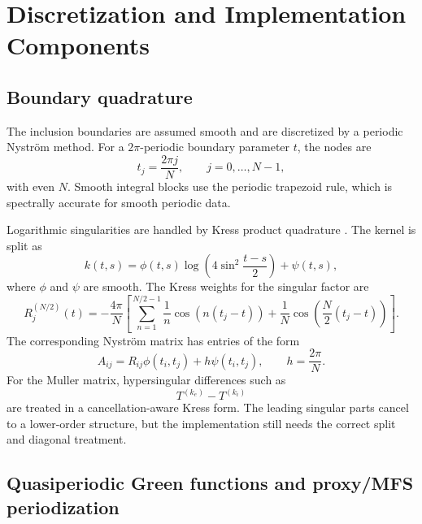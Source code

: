 %
%
%
%
%

\section{Discretization and Implementation Components}

\subsection{Boundary quadrature}

The inclusion boundaries are assumed smooth and are discretized by a periodic
Nystr\"om method.  For a \(2\pi\)-periodic boundary parameter \(t\), the nodes are
\[
  t_j=\frac{2\pi j}{N},
  \qquad
  j=0,\ldots,N-1,
\]
with even \(N\).  Smooth integral blocks use the periodic trapezoid rule, which
is spectrally accurate for smooth periodic data.

Logarithmic singularities are handled by Kress product quadrature
\cite{Kress1991,Kress2014}.  The kernel is split as
\[
  k(t,s)
  =
  \phi(t,s)\log\!\left(4\sin^2\frac{t-s}{2}\right)
  +
  \psi(t,s),
\]
where \(\phi\) and \(\psi\) are smooth.  The Kress weights for the singular
factor are
\[
  R_j^{(N/2)}(t)
  =
  -\frac{4\pi}{N}
  \left[
  \sum_{n=1}^{N/2-1}\frac{1}{n}\cos(n(t_j-t))
  +
  \frac{1}{N}\cos\!\left(\frac{N}{2}(t_j-t)\right)
  \right].
\]
The corresponding Nystr\"om matrix has entries of the form
\[
  A_{ij}=R_{ij}\phi(t_i,t_j)+h\psi(t_i,t_j),
  \qquad
  h=\frac{2\pi}{N}.
\]
For the Muller matrix, hypersingular differences such as
\[
  T^{(k_e)}-T^{(k_i)}
\]
are treated in a cancellation-aware Kress form.  The leading singular parts
cancel to a lower-order structure, but the implementation still needs the
correct split and diagonal treatment.

\subsection{Quasiperiodic Green functions and proxy/MFS periodization}

